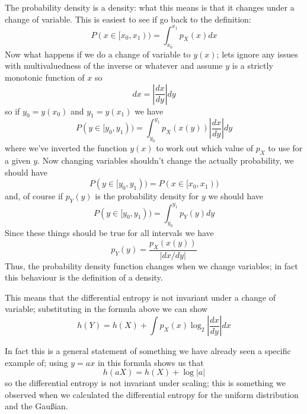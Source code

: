 \documentclass[12pt]{article}
\begin{document}
The probability density is a density: what this means is that it
changes under a change of variable. This is easiest to see if go back to the definition:
\begin{equation}
  P(x\in[x_0,x_1))=\int_{x_0}^{x_1}p_X(x)dx
\end{equation}
Now what happens if we do a change of variable to $y(x)$; lets ignore
any issues with multivaluedness of the inverse or whatever and assume
$y$ is a strictly monotonic function of $x$ so
\begin{equation}
  dx=\left|\frac{dx}{dy}\right|dy
\end{equation}
so if $y_0=y(x_0)$ and $y_1=y(x_1)$ we have
\begin{equation}
  P(y\in[y_0,y_1))=\int_{y_0}^{y_1} p_X(x(y))\left|\frac{dx}{dy}\right|dy
\end{equation}
where we've inverted the function $y(x)$ to work out which value of
$p_X$ to use for a given $y$. Now changing variables shouldn't change
the actually probability, we should have
\begin{equation}
  P(y\in[y_0,y_1))=  P(x\in[x_0,x_1))
\end{equation}
and, of course if $p_Y(y)$ is the probability density for $y$ we should have 
\begin{equation}
  P(y\in[y_0,y_1))=\int_{y_0}^{y_1} p_Y(y)dy
\end{equation}
Since these things should be true for all intervals we have
\begin{equation}
  p_Y(y)=\frac{p_X(x(y))}{|dx/dy|}
\end{equation}
Thus, the probability density function changes when we change
variables; in fact this behaviour is the definition of a density.

This means that the differential entropy is not invariant under a change of variable; substituting in the formula above we can show
\begin{equation}
  h(Y)=h(X)+\int p_X(x) \log_2\left|\frac{dx}{dy}\right|dx
\end{equation}

In fact this is a general statement of something we have already seen
a specific example of; using $y=a x$ in this formula shows us that
\begin{equation}
  h(aX)=h(X)+\log{|a|}
\end{equation}
so the differential entropy is not invariant under scaling; this is
something we observed when we calculated the differential entropy for
the uniform distribution and the Gau{\ss}ian.
\end{document}
